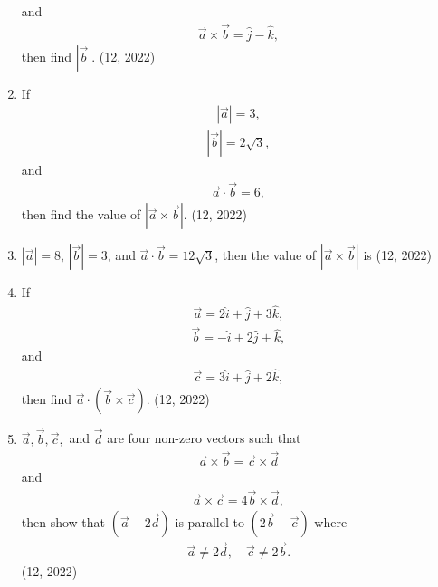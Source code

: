 \begin{enumerate}[label=\thesubsection.\arabic*,ref=\thesubsection.\theenumi]
    and
    \begin{align*}
        \overrightarrow{a} \times \overrightarrow{b} = \hat{j} - \hat{k},
    \end{align*}
    then find $\left| \overrightarrow{b} \right|$.
    \hfill (12, 2022)
    \item If
    \begin{align*}
        \left| \overrightarrow{a} \right| = 3,
    \end{align*}
    \begin{align*}
        \left| \overrightarrow{b} \right| = 2\sqrt{3},
    \end{align*}
    and
    \begin{align*}
        \overrightarrow{a} \cdot \overrightarrow{b} = 6,
    \end{align*}
    then find the value of $\left| \overrightarrow{a} \times \overrightarrow{b} \right|$.
    \hfill (12, 2022)

    \item $\left| \overrightarrow{a} \right| = 8$, $\left| \overrightarrow{b} \right| = 3$, and $\overrightarrow{a} \cdot \overrightarrow{b} = 12\sqrt{3}$, then the value of $\left| \overrightarrow{a} \times \overrightarrow{b} \right|$ is
    \hfill (12, 2022)
    \item If
    \begin{align*}
        \overrightarrow{a} = 2\hat{i} + \hat{j} + 3\hat{k},
    \end{align*}
    \begin{align*}
        \overrightarrow{b} = -\hat{i} + 2\hat{j} + \hat{k},
    \end{align*}
    and
    \begin{align*}
        \overrightarrow{c} = 3\hat{i} + \hat{j} + 2\hat{k},
    \end{align*}
    then find $\overrightarrow{a} \cdot (\overrightarrow{b} \times \overrightarrow{c})$.
    \hfill (12, 2022)

    \item $\overrightarrow{a}, \overrightarrow{b}, \overrightarrow{c},$ and $\overrightarrow{d}$ are four non-zero vectors such that
    \begin{align*}
        \overrightarrow{a} \times \overrightarrow{b} = \overrightarrow{c} \times \overrightarrow{d}
    \end{align*}
    and
    \begin{align*}
        \overrightarrow{a} \times \overrightarrow{c} = 4\overrightarrow{b} \times \overrightarrow{d},
    \end{align*}
    then show that $(\overrightarrow{a} - 2\overrightarrow{d})$ is parallel to $(2\overrightarrow{b} - \overrightarrow{c})$ where
    \begin{align*}
        \overrightarrow{a} \neq 2\overrightarrow{d}, \quad \overrightarrow{c} \neq 2\overrightarrow{b}.
    \end{align*}
    \hfill (12, 2022)


\end{enumerate}
